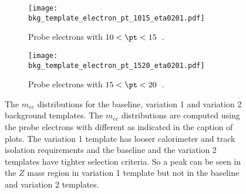 \begin{figure}[htb]
    \begin{subfigure}[b]{0.48\textwidth}
        \begin{center}
            \texttt{[image: bkg\_template\_electron\_pt\_1015\_eta0201.pdf]}
            \caption{Probe electrons with $10 < \pt < 15$~{\GeV}.}
        \end{center}
    \end{subfigure}
    \begin{subfigure}[b]{0.48\textwidth}
        \begin{center}
            \texttt{[image: bkg\_template\_electron\_pt\_1520\_eta0201.pdf]}
            \caption{Probe electrons with $15 < \pt < 20$~{\GeV}.}
        \end{center}
    \end{subfigure}
    \caption{The $m_{ee}$ distributions for the baseline, variation 1 and variation 2 background templates.
    The $m_{ee}$ distributions are computed using the probe electrons with different \pt as indicated in the caption of plots.
    The variation 1 template has looser calorimeter and track isolation requirements and the baseline and the variation 2 templates have tighter selection criteria.
    So a peak can be seen in the $Z$ mass region in variation 1 template but not in the baseline and variation 2 templates.}
    \label{fig:app_RLE_bkg_templates}
\end{figure}

